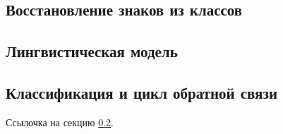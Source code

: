 \subsection{Восстановление знаков из классов}

\subsection{Лингвистическая модель}
\label{section: bigramm language model}

\subsection{Классификация и цикл обратной связи}

Ссылочка на секцию \ref{section: bigramm language model}.



















